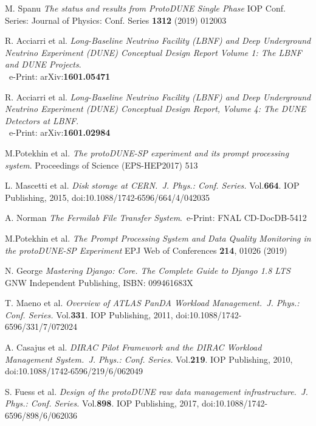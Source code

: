 \documentclass{webofc}
\begin{document}
\begin{thebibliography}{99}

M. Spanu
\emph{The status and results from ProtoDUNE Single Phase}
IOP Conf. Series: Journal of Physics: Conf. Series \textbf{1312} (2019) 012003

R. Acciarri et al.
\emph{Long-Baseline Neutrino Facility (LBNF) and Deep Underground Neutrino Experiment (DUNE) Conceptual Design Report Volume 1: The LBNF and DUNE Projects}.\\ ~e-Print: arXiv:\textbf{1601.05471}


R. Acciarri et al.
\emph{Long-Baseline Neutrino Facility (LBNF) and Deep Underground Neutrino Experiment (DUNE) Conceptual Design Report, Volume 4: The DUNE Detectors at LBNF}.\\~e-Print: arXiv:\textbf{1601.02984}

 M.Potekhin et al. \emph{The protoDUNE-SP experiment and its prompt
processing system}. Proceedings of Science (EPS-HEP2017) 513


L. Mascetti et al. \emph{Disk storage at CERN.~J. Phys.: Conf. Series.} Vol.\textbf{664}. IOP Publishing, 2015,
doi:10.1088/1742-6596/664/4/042035

A. Norman \emph{The Fermilab File Transfer System}.~e-Print: FNAL CD-DocDB-5412

 M.Potekhin et al. \emph{The Prompt Processing System
and Data Quality Monitoring in the protoDUNE-SP Experiment}
EPJ Web of Conferences \textbf{214}, 01026 (2019)

N. George \emph{Mastering Django: Core. The Complete Guide to Django 1.8 LTS}~ GNW Independent Publishing, ISBN: 099461683X

T. Maeno et al. \emph{Overview of ATLAS PanDA Workload Management.~J. Phys.: Conf. Series.} Vol.\textbf{331}. IOP Publishing, 2011,
doi:10.1088/1742-6596/331/7/072024


A. Casajus et al.  \emph{DIRAC Pilot Framework and the DIRAC
Workload Management System.~J. Phys.: Conf. Series.} Vol.\textbf{219}. IOP Publishing, 2010,
doi:10.1088/1742-6596/219/6/062049



S. Fuess et al. \emph{Design of the protoDUNE raw data management
infrastructure.~J. Phys.: Conf. Series.} Vol.\textbf{898}. IOP Publishing, 2017,
doi:10.1088/1742-6596/898/6/062036



\end{thebibliography}
\end{document}
